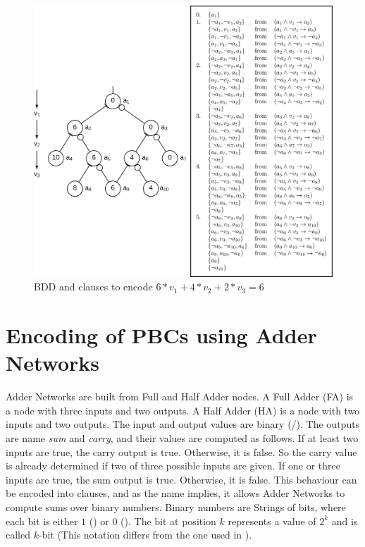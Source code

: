 \begin{figure}
\centering
\includegraphics[width=\textwidth]{Figures/BDDExampleComposition3.png}
\caption{BDD and clauses to encode $6*v_1+4*v_2+2*v_3=6$}
\label{fig:BDDExample}
\end{figure}


\section{Encoding of PBCs using Adder Networks}\label{PBCEncodingAdderNetworks}
Adder Networks are built from Full and Half Adder nodes. A Full Adder (FA) is a node with three inputs and two outputs. A Half Adder (HA) is a node with two inputs and two outputs. The input and output values are binary (\true{}/\false{}). The outputs are name \emph{sum} and \emph{carry}, and their values are computed as follows. If at least two inputs are true, the carry output is true. Otherwise, it is false. So the carry value is already determined if two of three possible inputs are given. If one or three inputs are true, the sum output is true. Otherwise, it is false. This behaviour can be encoded into clauses, and as the name implies, it allows Adder Networks to compute sums over binary numbers. Binary numbers are Strings of bits, where each bit is either $1$ (\true) or $0$ (\false). The bit at position $k$ represents a value of $2^k$ and is called $k$-bit (This notation differs from the one used in \cite{Een2006TranslatingPC}). \\

